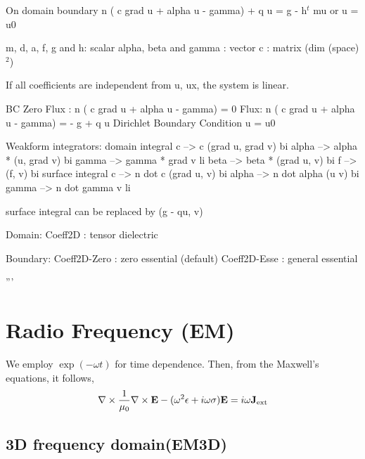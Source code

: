 \documentclass[11pt,a4paper,final]{report}
\begin{document}
  On domain boundary
     n ( c grad u + alpha u - gamma) + q u = g - h$^t$ mu
       or 
     u = u0  

    m, d, a, f, g and h: scalar
    alpha, beta and gamma : vector
    c  : matrix (dim (space) $^2$)

    If all coefficients are independent from u, ux,
    the system is linear.

    BC
     Zero Flux : 
        n ( c grad u + alpha u - gamma) = 0
     Flux: 
        n ( c grad u + alpha u - gamma) = - g + q u
     Dirichlet Boundary Condition
        u = u0

  Weakform integrators:
    domain integral
       c     -->  c (grad u, grad v)     bi
       alpha -->  alpha * (u, grad v)    bi
       gamma -->  gamma * grad v         li
       beta  -->  beta * (grad u, v)     bi
       f     -->  (f, v)                 bi
    surface integral
       c     -->   n dot c (grad u, v)   bi
       alpha -->   n dot alpha  (u v)    bi
       gamma -->   n dot gamma   v       li
 
    surface integral can be replaced by (g - qu, v)
        
  Domain:   
     Coeff2D          : tensor dielectric

  Boundary:
     Coeff2D-Zero     : zero essential (default)
     Coeff2D-Esse     : general essential

'''
\section{Radio Frequency (EM)}

We employ $\exp{(-\omega t)}$ for time dependence. Then, from the Maxwell's equations, it follows,
\begin{equation}
\nabla \times \frac{1}{\mu_0} \nabla \times \mathbf{E} - (\omega^2 \epsilon + i \omega \sigma) \mathbf{E} = i \omega \mathbf{J}_{\rm ext}
\end{equation}

\subsection{3D frequency domain(EM3D)}
\end{document}

